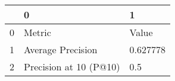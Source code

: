 \begin{tabular}{lll}
\toprule
{} &                       0 &         1 \\
\midrule
0 &                  Metric &     Value \\
1 &       Average Precision &  0.627778 \\
2 &  Precision at 10 (P@10) &       0.5 \\
\bottomrule
\end{tabular}
